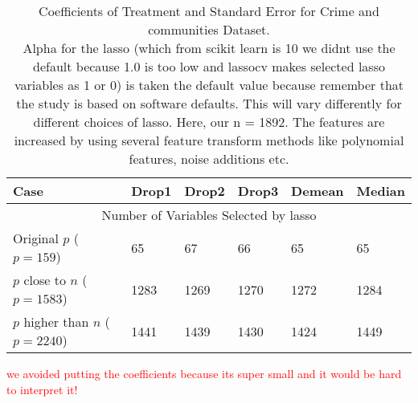 \begin{table}[h!]
\renewcommand{\arraystretch}{1.5}
\centering
\begin{tabular}{||l l l l l l||} 
 \hline
 \hline
 Case & Drop1 & Drop2 & Drop3 & Demean & Median \\ [0.5ex] 
 \hline\hline 
 \multicolumn{6}{||c||}{Number of Variables Selected by lasso} \\ [0.5ex]
 Original $p$ ($p = 159$) & 65 & 67 & 66 & 65 & 65 \\ 
 $p$ close to $n$ ($p = 1583$) & 1283 & 1269 & 1270 & 1272 & 1284 \\
 $p$ higher than $n$ ($p= 2240$) & 1441 & 1439 & 1430 & 1424 & 1449 \\ [1ex] 
 \hline
\end{tabular}
\caption{Coefficients of Treatment and Standard Error for Crime and communities Dataset.  \\
Alpha for the lasso (which from scikit learn is 10 we didnt use the default because 1.0 is too low and lassocv makes selected lasso variables as 1 or 0) is taken the default value because remember that the study is based on software defaults. This will vary differently for different choices of lasso. Here, our n = 1892. The features are increased by using several feature transform methods like polynomial features, noise additions etc.  }
\textcolor{red}{we avoided putting the coefficients because its super small and it would be hard to interpret it!}
\label{table:1}
\end{table}

